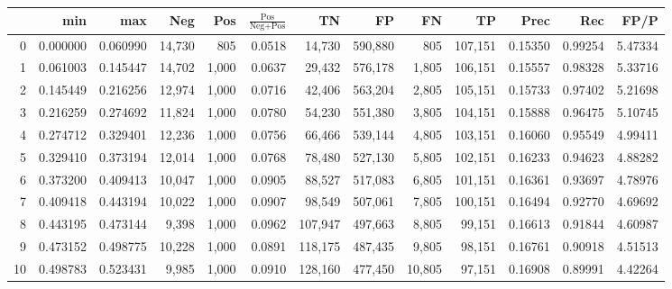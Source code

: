 \begin{tabular}{rrrrrrrrrrrrr}
\toprule
{} &       min &       max &     Neg &    Pos & $\frac{\text{Pos}}{\text{Neg}+\text{Pos}}$ &       TN &       FP &       FN &       TP &     Prec &      Rec &     FP/P \\
\midrule
0   &  0.000000 &  0.060990 &  14,730 &    805 &                                     0.0518 &   14,730 &  590,880 &      805 &  107,151 &  0.15350 &  0.99254 &  5.47334 \\
1   &  0.061003 &  0.145447 &  14,702 &  1,000 &                                     0.0637 &   29,432 &  576,178 &    1,805 &  106,151 &  0.15557 &  0.98328 &  5.33716 \\
2   &  0.145449 &  0.216256 &  12,974 &  1,000 &                                     0.0716 &   42,406 &  563,204 &    2,805 &  105,151 &  0.15733 &  0.97402 &  5.21698 \\
3   &  0.216259 &  0.274692 &  11,824 &  1,000 &                                     0.0780 &   54,230 &  551,380 &    3,805 &  104,151 &  0.15888 &  0.96475 &  5.10745 \\
4   &  0.274712 &  0.329401 &  12,236 &  1,000 &                                     0.0756 &   66,466 &  539,144 &    4,805 &  103,151 &  0.16060 &  0.95549 &  4.99411 \\
5   &  0.329410 &  0.373194 &  12,014 &  1,000 &                                     0.0768 &   78,480 &  527,130 &    5,805 &  102,151 &  0.16233 &  0.94623 &  4.88282 \\
6   &  0.373200 &  0.409413 &  10,047 &  1,000 &                                     0.0905 &   88,527 &  517,083 &    6,805 &  101,151 &  0.16361 &  0.93697 &  4.78976 \\
7   &  0.409418 &  0.443194 &  10,022 &  1,000 &                                     0.0907 &   98,549 &  507,061 &    7,805 &  100,151 &  0.16494 &  0.92770 &  4.69692 \\
8   &  0.443195 &  0.473144 &   9,398 &  1,000 &                                     0.0962 &  107,947 &  497,663 &    8,805 &   99,151 &  0.16613 &  0.91844 &  4.60987 \\
9   &  0.473152 &  0.498775 &  10,228 &  1,000 &                                     0.0891 &  118,175 &  487,435 &    9,805 &   98,151 &  0.16761 &  0.90918 &  4.51513 \\
10  &  0.498783 &  0.523431 &   9,985 &  1,000 &                                     0.0910 &  128,160 &  477,450 &   10,805 &   97,151 &  0.16908 &  0.89991 &  4.42264 \\

\end{tabular}
